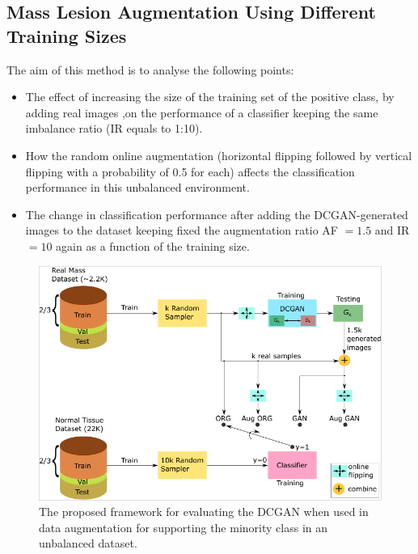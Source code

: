 \documentclass[final,3p,twocolumn,authoryear,sort&compress,times]{maia}
\begin{document}

\subsection{Mass Lesion Augmentation Using Different Training Sizes}
\label{sec:lesion_augmentation}
The aim of this method is to analyse the following points:
\begin{itemize}
    \item The effect of increasing the size of the training set of the positive class, by adding real images ,on the performance of a classifier keeping the same imbalance ratio (IR equals to 1:10).
    \item How the random online augmentation (horizontal flipping followed by vertical flipping with a probability of 0.5 for each) affects the classification performance in this unbalanced environment.
    \item The change in classification performance after adding the DCGAN-generated images to the dataset keeping fixed the augmentation ratio AF $= 1.5$ and IR$=10$ again as a function of the training size.
\end{itemize}
\begin{figure}
    \centering
    \includegraphics[keepaspectratio]{figures/methodology.pdf}
    \caption{The proposed framework for evaluating the DCGAN when used in data augmentation for supporting the minority class in an unbalanced dataset.}
    \label{fig:methodology}
\end{figure}
\end{document}
